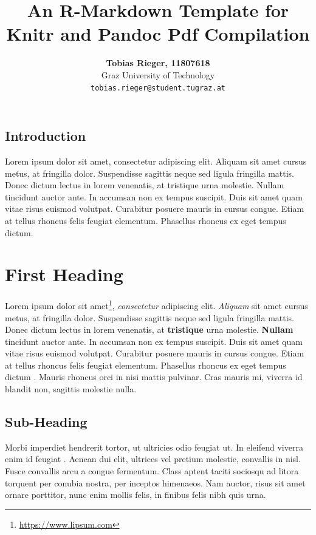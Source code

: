\documentclass[
  11pt,
  a4paper]{article}
\author{\textbf{Tobias Rieger, 11807618}\\ Graz University of Technology\\ {\normalsize \texttt{tobias.rieger@student.tugraz.at}}}
\title{An R-Markdown Template for Knitr and Pandoc Pdf Compilation}
\date{}
\begin{document}
\maketitle

\begin{adjustwidth}{16pt}{16pt}
\section*{\centering Introduction}
Lorem ipsum dolor sit amet, consectetur adipiscing elit. Aliquam sit amet cursus metus, at fringilla dolor. Suspendisse sagittis neque sed ligula fringilla mattis. Donec dictum lectus in lorem venenatis, at tristique urna molestie. Nullam tincidunt auctor ante. In accumsan non ex tempus suscipit. Duis sit amet quam vitae risus euismod volutpat. Curabitur posuere mauris in cursus congue. Etiam at tellus rhoncus felis feugiat elementum. Phasellus rhoncus ex eget tempus dictum.
\end{adjustwidth}

\hypertarget{first-heading}{%
\section{First Heading}\label{first-heading}}

Lorem ipsum dolor sit amet\footnote{\url{https://www.lipsum.com}},
\emph{consectetur} adipiscing elit. \emph{Aliquam} sit amet cursus
metus, at fringilla dolor. Suspendisse sagittis neque sed ligula
fringilla mattis. Donec dictum lectus in lorem venenatis, at
\textbf{tristique} urna molestie. \textbf{Nullam} tincidunt auctor ante.
In accumsan non ex tempus suscipit. Duis sit amet quam vitae risus
euismod volutpat. Curabitur posuere mauris in cursus congue. Etiam at
tellus rhoncus felis feugiat elementum. Phasellus rhoncus ex eget tempus
dictum \citep{Chang2015}. Mauris rhoncus orci in nisi mattis pulvinar.
Cras mauris mi, viverra id blandit non, sagittis molestie nulla.

\hypertarget{sub-heading}{%
\subsection{Sub-Heading}\label{sub-heading}}

Morbi imperdiet hendrerit tortor, ut ultricies odio feugiat ut. In
eleifend viverra enim id feugiat \citep{RCoreTeam}. Aenean dui elit,
ultrices vel pretium molestie, convallis in nisl. Fusce convallis arcu a
congue fermentum. Class aptent taciti sociosqu ad litora torquent per
conubia nostra, per inceptos himenaeos. Nam auctor, risus sit amet
ornare porttitor, nunc enim mollis felis, in finibus felis nibh quis
urna.
\end{document}
